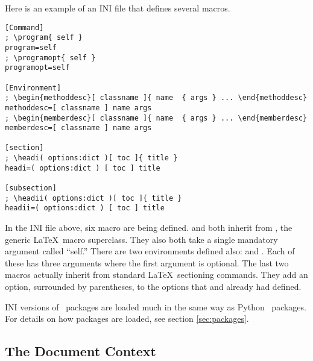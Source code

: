 Here is an example of an INI file that defines several macros.
\begin{verbatim}
[Command]
; \program{ self }
program=self
; \programopt{ self }
programopt=self

[Environment]
; \begin{methoddesc}[ classname ]{ name  { args } ... \end{methoddesc}
methoddesc=[ classname ] name args
; \begin{memberdesc}[ classname ]{ name  { args } ... \end{memberdesc}
memberdesc=[ classname ] name args

[section]
; \headi( options:dict )[ toc ]{ title }
headi=( options:dict ) [ toc ] title

[subsection]
; \headii( options:dict )[ toc ]{ title }
headii=( options:dict ) [ toc ] title
\end{verbatim}

In the INI file above, six macro are being defined.   and
 both inherit from , the generic
\LaTeX\ macro superclass.  They also both take a single mandatory argument
called ``self.''  There are two environments defined also:
 and .  Each of these
has three arguments where the first argument is optional.  The
last two macros actually inherit from standard \LaTeX\ sectioning commands.
They add an option, surrounded by parentheses, to the options that
 and  already had defined.

INI versions of \plasTeX\ packages are loaded much in the same way as
Python \plasTeX\ packages.  For details on how packages are loaded, see
section \ref{sec:packages}.


\subsection{The Document Context\label{sec:contextmacros}}

